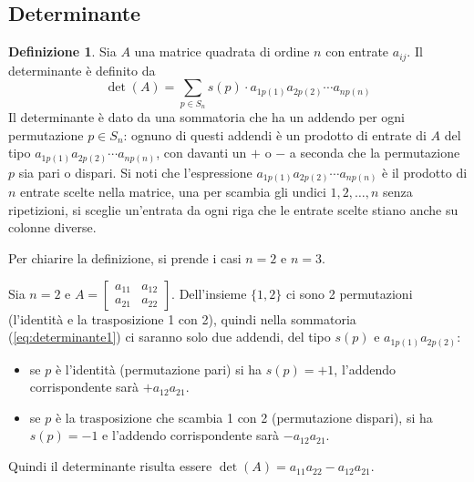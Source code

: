\documentclass{book}
\theoremstyle{definition}
\newtheorem{defi}{Definizione}[section]
\theoremstyle{plain}
\begin{document}
\subsection{Determinante}
\label{sec:determinante}

\begin{defi}
  \label{defi:determinante1}
  Sia $A$ una matrice quadrata di ordine $n$ con entrate $a_{ij}$. Il determinante è
  definito da
  \begin{equation}
    \label{eq:determinante1}
    \det (A)=\sum_{p\in S_n}s(p)\cdot a_{1p(1)}a_{2p(2)}\cdots a_{np(n)}
  \end{equation}
  Il determinante è dato da una sommatoria che ha un addendo per ogni permutazione
  $p\in S_n$: ognuno di questi addendi è un prodotto di entrate di $A$ del tipo
  $a_{1p(1)}a_{2p(2)}\cdots a_{np(n)}$, con davanti un $+$ o $-$ a seconda che la
  permutazione $p$ sia pari o dispari. Si noti che l'espressione
  $a_{1p(1)}a_{2p(2)}\cdots a_{np(n)}$ è il prodotto di $n$ entrate scelte nella
  matrice, una per scambia gli undici $1,2,\dots,n$ senza ripetizioni, si sceglie
  un'entrata da ogni riga che le entrate scelte stiano anche su colonne diverse.
\end{defi}
Per chiarire la definizione, si prende i casi $n = 2$ e $n=3$.

Sia $n=2$ e $A=
\begin{bmatrix}
  a_{11} & a_{12}\\
  a_{21} & a_{22}
\end{bmatrix}
$. Dell'insieme $\{1,2\}$ ci sono 2 permutazioni (l'identità e la trasposizione 1
con 2), quindi nella sommatoria (\ref{eq:determinante1}) ci saranno solo due
addendi, del tipo $s(p)$ e $a_{1p(1)}a_{2p(2)}$:
\begin{itemize}
\item se $p$ è l'identità (permutazione pari) si ha $s(p)=+1$, l'addendo
  corrispondente sarà $+a_{12} a_{21}$.
\item se $p$ è la trasposizione che scambia 1 con 2 (permutazione dispari), si ha
  $s(p)=-1$ e l'addendo corrispondente sarà $-a_{12} a_{21}$.
\end{itemize}
Quindi il determinante risulta essere $\det(A)=a_{11}a_{22} -a_{12} a_{21}$.
\end{document}
